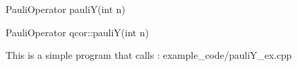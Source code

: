 
\begin{apidefinition}

\begin{Csynopsis}
    PauliOperator pauliY(int n)
\end{Csynopsis}

\begin{Cppsynopsis}
    PauliOperator qcor::pauliY(int n)
\end{Cppsynopsis}


\begin{apiarguments}
\end{apiarguments}



\apinotes{
    
}

\begin{apiexamples}

\apicppexample
    { This is a simple program that calls : } 
    { example_code/pauliY_ex.cpp} 
    {}

\end{apiexamples}

\end{apidefinition}
